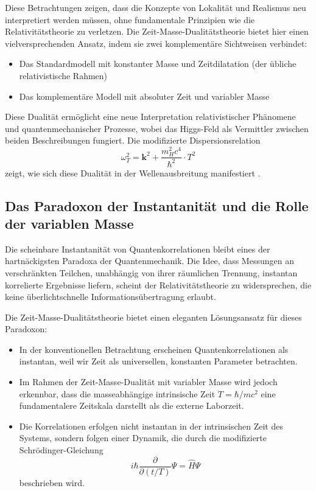 \documentclass[a4paper,12pt]{article}
\begin{document}
	Diese Betrachtungen zeigen, dass die Konzepte von Lokalität und Realismus neu interpretiert werden müssen, ohne fundamentale Prinzipien wie die Relativitätstheorie zu verletzen. Die Zeit-Masse-Dualitätstheorie bietet hier einen vielversprechenden Ansatz, indem sie zwei komplementäre Sichtweisen verbindet:
	
	\begin{itemize}
		\item Das Standardmodell mit konstanter Masse und Zeitdilatation (der übliche relativistische Rahmen)
		\item Das komplementäre Modell mit absoluter Zeit und variabler Masse
	\end{itemize}
	
	Diese Dualität ermöglicht eine neue Interpretation relativistischer Phänomene und quantenmechanischer Prozesse, wobei das Higgs-Feld als Vermittler zwischen beiden Beschreibungen fungiert. Die modifizierte Dispersionsrelation 
	\begin{equation}
		\omega_T^2 = \mathbf{k}^2 + \frac{m_H^2 c^4}{\hbar^2} \cdot T^2
	\end{equation}
	zeigt, wie sich diese Dualität in der Wellenausbreitung manifestiert \cite{Pascher2024}.
	
	\subsection{Das Paradoxon der Instantanität und die Rolle der variablen Masse}
	
	Die scheinbare Instantanität von Quantenkorrelationen bleibt eines der hartnäckigsten Paradoxa der Quantenmechanik. Die Idee, dass Messungen an verschränkten Teilchen, unabhängig von ihrer räumlichen Trennung, instantan korrelierte Ergebnisse liefern, scheint der Relativitätstheorie zu widersprechen, die keine überlichtschnelle Informationsübertragung erlaubt.
	
	Die Zeit-Masse-Dualitätstheorie bietet einen eleganten Lösungsansatz für dieses Paradoxon:
	
	\begin{itemize}
		\item In der konventionellen Betrachtung erscheinen Quantenkorrelationen als instantan, weil wir Zeit als universellen, konstanten Parameter betrachten.
		
		\item Im Rahmen der Zeit-Masse-Dualität mit variabler Masse wird jedoch erkennbar, dass die masseabhängige intrinsische Zeit $T = \hbar/mc^2$ eine fundamentalere Zeitskala darstellt als die externe Laborzeit.
		
		\item Die Korrelationen erfolgen nicht instantan in der intrinsischen Zeit des Systems, sondern folgen einer Dynamik, die durch die modifizierte Schrödinger-Gleichung
		\begin{equation}
			i\hbar \frac{\partial}{\partial (t/T)}\Psi = \hat{H}\Psi
		\end{equation}
		beschrieben wird.
	\end{itemize}
	
\end{document}
